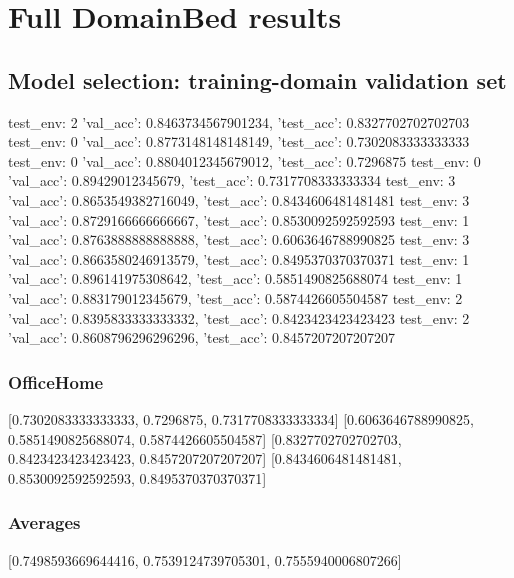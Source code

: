 \documentclass{article}
\begin{document}
\section{Full DomainBed results}

\subsection{Model selection: training-domain validation set}
test_env: 2
{'val_acc': 0.8463734567901234, 'test_acc': 0.8327702702702703}
test_env: 0
{'val_acc': 0.8773148148148149, 'test_acc': 0.7302083333333333}
test_env: 0
{'val_acc': 0.8804012345679012, 'test_acc': 0.7296875}
test_env: 0
{'val_acc': 0.89429012345679, 'test_acc': 0.7317708333333334}
test_env: 3
{'val_acc': 0.8653549382716049, 'test_acc': 0.8434606481481481}
test_env: 3
{'val_acc': 0.8729166666666667, 'test_acc': 0.8530092592592593}
test_env: 1
{'val_acc': 0.8763888888888888, 'test_acc': 0.6063646788990825}
test_env: 3
{'val_acc': 0.8663580246913579, 'test_acc': 0.8495370370370371}
test_env: 1
{'val_acc': 0.896141975308642, 'test_acc': 0.5851490825688074}
test_env: 1
{'val_acc': 0.883179012345679, 'test_acc': 0.5874426605504587}
test_env: 2
{'val_acc': 0.8395833333333332, 'test_acc': 0.8423423423423423}
test_env: 2
{'val_acc': 0.8608796296296296, 'test_acc': 0.8457207207207207}

\subsubsection{OfficeHome}
[0.7302083333333333, 0.7296875, 0.7317708333333334]
[0.6063646788990825, 0.5851490825688074, 0.5874426605504587]
[0.8327702702702703, 0.8423423423423423, 0.8457207207207207]
[0.8434606481481481, 0.8530092592592593, 0.8495370370370371]

\begin{center}
\end{center}

\subsubsection{Averages}
[0.7498593669644416, 0.7539124739705301, 0.7555940006807266]

\begin{center}
\end{center}
\end{document}
